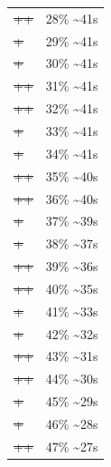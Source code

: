 \documentclass[12pt]{article}
\begin{document}
\begin{center}
\begin{tabular}{ll}
\sout{\sout{\sout{\sout{\sout{\sout{++}}}}}} & 28\% \textasciitilde{}41s\\
\sout{\sout{\sout{\sout{\sout{\sout{\sout{+}}}}}}} & 29\% \textasciitilde{}41s\\
\sout{\sout{\sout{\sout{\sout{\sout{\sout{+}}}}}}} & 30\% \textasciitilde{}41s\\
\sout{\sout{\sout{\sout{\sout{\sout{\sout{++}}}}}}} & 31\% \textasciitilde{}41s\\
\sout{\sout{\sout{\sout{\sout{\sout{\sout{++}}}}}}} & 32\% \textasciitilde{}41s\\
\sout{\sout{\sout{\sout{\sout{\sout{\sout{\sout{+}}}}}}}} & 33\% \textasciitilde{}41s\\
\sout{\sout{\sout{\sout{\sout{\sout{\sout{\sout{+}}}}}}}} & 34\% \textasciitilde{}41s\\
\sout{\sout{\sout{\sout{\sout{\sout{\sout{\sout{++}}}}}}}} & 35\% \textasciitilde{}40s\\
\sout{\sout{\sout{\sout{\sout{\sout{\sout{\sout{++}}}}}}}} & 36\% \textasciitilde{}40s\\
\sout{\sout{\sout{\sout{\sout{\sout{\sout{\sout{\sout{+}}}}}}}}} & 37\% \textasciitilde{}39s\\
\sout{\sout{\sout{\sout{\sout{\sout{\sout{\sout{\sout{+}}}}}}}}} & 38\% \textasciitilde{}37s\\
\sout{\sout{\sout{\sout{\sout{\sout{\sout{\sout{\sout{++}}}}}}}}} & 39\% \textasciitilde{}36s\\
\sout{\sout{\sout{\sout{\sout{\sout{\sout{\sout{\sout{++}}}}}}}}} & 40\% \textasciitilde{}35s\\
\sout{\sout{\sout{\sout{\sout{\sout{\sout{\sout{\sout{\sout{+}}}}}}}}}} & 41\% \textasciitilde{}33s\\
\sout{\sout{\sout{\sout{\sout{\sout{\sout{\sout{\sout{\sout{+}}}}}}}}}} & 42\% \textasciitilde{}32s\\
\sout{\sout{\sout{\sout{\sout{\sout{\sout{\sout{\sout{\sout{++}}}}}}}}}} & 43\% \textasciitilde{}31s\\
\sout{\sout{\sout{\sout{\sout{\sout{\sout{\sout{\sout{\sout{++}}}}}}}}}} & 44\% \textasciitilde{}30s\\
\sout{\sout{\sout{\sout{\sout{\sout{\sout{\sout{\sout{\sout{\sout{+}}}}}}}}}}} & 45\% \textasciitilde{}29s\\
\sout{\sout{\sout{\sout{\sout{\sout{\sout{\sout{\sout{\sout{\sout{+}}}}}}}}}}} & 46\% \textasciitilde{}28s\\
\sout{\sout{\sout{\sout{\sout{\sout{\sout{\sout{\sout{\sout{\sout{++}}}}}}}}}}} & 47\% \textasciitilde{}27s\\

\end{tabular}
\end{center}
\end{document}

